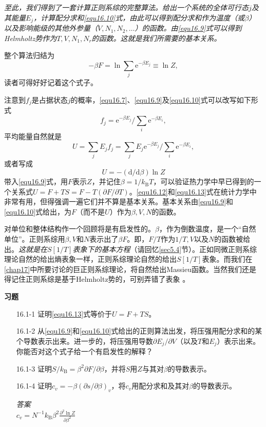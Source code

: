 {\it 至此，我们得到了一套计算正则系综的完整算法。给出一个系统的全体可行态$j$及其能量$E_j$，计算配分求和\ref{equ16.10}式，由此可以得到配分求和作为温度（或$\beta$）以及影响能级的其他外参量（$V,N_1,N_2,\dots$）的函数。由\eqref{equ16.9}式可以得到Helmholtz势作为$T,V,N_1,N_r$的函数。这就是我们所需要的基本关系。}

整个算法归结为
\begin{equation}
-\beta F = \ln \sum\limits_j \mathrm e^{-\beta E_j} \equiv \ln Z,
\end{equation}
读者可得好好记着这个式子。

注意到$f_j$是占据状态$j$的概率，\eqref{equ16.7}、\eqref{equ16.9}及\eqref{equ16.10}式可以改写如下形式
\begin{equation}
f_j  = {\mathrm e}^{-\beta E_j}/\sum\limits_i \mathrm e^{-\beta E_i},
\end{equation}
平均能量自然就是
\begin{equation}
U = \sum\limits_j E_jf_j = \sum\limits_j E_j{\mathrm e}^{-\beta E_j}/\sum\limits_i \mathrm e^{-\beta E_i},
\label{equ16.12}
\end{equation}
或者写成
\begin{equation}
U = -(\mathrm d/\mathrm d\beta)\ln Z
\label{equ16.13}
\end{equation}
带入\eqref{equ16.9}式，用$F$表示$Z$，并记住$\beta = 1/k_\text{B}T$，可以验证热力学中早已得到的一个关系式$U=F+TS=F-T(\partial F/\partial T)$。\eqref{equ16.12}和\eqref{equ16.13}式在统计力学中非常有用，但得强调一遍它们并不算是基本关系。基本关系由\eqref{equ16.9}和\eqref{equ16.10}式给出，为$F$（而不是$U$）作为$\beta,V,N$的函数。

对单位和整体结构作一个回顾将是有启发性的。$\beta$，作为倒数温度，是一个“自然单位”。正则系综用$\beta,V$和$N$表示出了$\beta F$。即，$F/T$作为$1/T,V$以及$N$的函数被给出。{\it 这就是在$S[1/T]$表象下的基本方程}（请回忆\ref{sec5.4}节）。正如同微正则系综理论自然的给出熵表象一样，正则系综理论自然的给出$S[1/T]$表象。而我们在\ref{chap17}中所要讨论的巨正则系综理论，将自然给出Massieu函数。当然我们还是得记住正则系综是基于Helmholtz势的，可别弄错了表象%
%
。

{\noindent\bf 习题}
\begin{itemize}
\item[16.1-1] 证明\eqref{equ16.13}式等价于$U=F+TS$。
\item[16.1-2] 从\eqref{equ16.9}和\eqref{equ16.10}式给出的正则算法出发，将压强用配分求和的某个导数表示出来。进一步的，将压强用导数$\partial E_j/\partial V$（以及$T$和$E_j$）表示出来。你能否对这个式子给一个有启发性的解释？
\item[16.1-3] 证明$S/k_\text{B}=\beta^2\partial F/\partial\beta$，并将$S$用$Z$与其对$\beta$的导数表示。
\item[16.1-4] 证明$c_v=-\beta(\partial s/\partial\beta)_v$，将$c_v$用配分求和及其对$\beta$的导数表示。
\begin{flushleft}
{\it 答案}\\
$c_v=N^{-1}k_\text{B}\beta^2\frac{\partial^2\ln Z}{\partial \beta^2}$
\end{flushleft}
\end{itemize}


